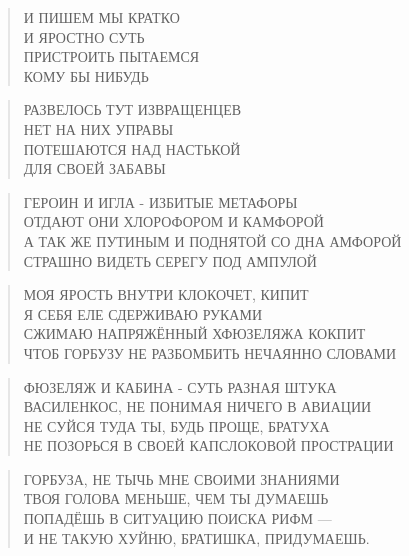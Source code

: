 \poemtitle{***}
\begin{verse}
И ПИШЕМ МЫ КРАТКО\\
И ЯРОСТНО СУТЬ\\
ПРИСТРОИТЬ ПЫТАЕМСЯ\\
КОМУ БЫ НИБУДЬ
\end{verse}

\poemtitle{***}
\begin{verse}
РАЗВЕЛОСЬ ТУТ ИЗВРАЩЕНЦЕВ\\
НЕТ НА НИХ УПРАВЫ\\
ПОТЕШАЮТСЯ НАД НАСТЬКОЙ\\
ДЛЯ СВОЕЙ ЗАБАВЫ
\end{verse}

\poemtitle{***}
\begin{verse}
ГЕРОИН И ИГЛА - ИЗБИТЫЕ МЕТАФОРЫ\\
ОТДАЮТ ОНИ ХЛОРОФОРОМ И КАМФОРОЙ\\
А ТАК ЖЕ ПУТИНЫМ И ПОДНЯТОЙ СО ДНА АМФОРОЙ\\
СТРАШНО ВИДЕТЬ СЕРЕГУ ПОД АМПУЛОЙ
\end{verse}

\poemtitle{***}
\begin{verse}
МОЯ ЯРОСТЬ ВНУТРИ КЛОКОЧЕТ, КИПИТ\\
Я СЕБЯ ЕЛЕ СДЕРЖИВАЮ РУКАМИ\\
СЖИМАЮ НАПРЯЖЁННЫЙ ХФЮЗЕЛЯЖА КОКПИТ\\
ЧТОБ ГОРБУЗУ НЕ РАЗБОМБИТЬ НЕЧАЯННО СЛОВАМИ
\end{verse}

\poemtitle{***}
\begin{verse}
ФЮЗЕЛЯЖ И КАБИНА - СУТЬ РАЗНАЯ ШТУКА\\
ВАСИЛЕНКОС, НЕ ПОНИМАЯ НИЧЕГО В АВИАЦИИ\\
НЕ СУЙСЯ ТУДА ТЫ, БУДЬ ПРОЩЕ, БРАТУХА\\
НЕ ПОЗОРЬСЯ В СВОЕЙ КАПСЛОКОВОЙ ПРОСТРАЦИИ
\end{verse}

\poemtitle{***}
\begin{verse}
ГОРБУЗА, НЕ ТЫЧЬ МНЕ СВОИМИ ЗНАНИЯМИ\\
ТВОЯ ГОЛОВА МЕНЬШЕ, ЧЕМ ТЫ ДУМАЕШЬ\\
ПОПАДЁШЬ В СИТУАЦИЮ ПОИСКА РИФМ —\\
И НЕ ТАКУЮ ХУЙНЮ, БРАТИШКА, ПРИДУМАЕШЬ.
\end{verse}

